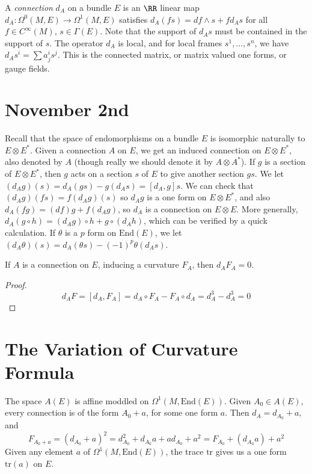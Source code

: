 A \emph{connection} $d_A$ on a bundle $E$ is an $\RR$ linear map $d_A: \Omega^0(M,E) \to \Omega^1(M,E)$ satisfies $d_A(fs) = df \wedge s + f d_A s$ for all $f \in C^\infty(M)$, $s \in \Gamma(E)$. Note that the support of $d_A s$ must be contained in the support of $s$. The operator $d_A$ is local, and for local frames $s^1, \dots, s^n$, we have $d_A s^i = \sum a_j^i s^j$. This is the connected matrix, or matrix valued one forms, or gauge fields.


\section{November 2nd}

Recall that the space of endomorphisms on a bundle $E$ is isomorphic naturally to $E \otimes E^*$. Given a connection $A$ on $E$, we get an induced connection on $E \otimes E^*$, also denoted by $A$ (though really we should denote it by $A \otimes A^*$). If $g$ is a section of $E \otimes E^*$, then $g$ acts on a section $s$ of $E$ to give another section $gs$. We let $(d_A g)(s) = d_A(gs) - g(d_A s) = [d_A, g] s$. We can check that $(d_A g)(fs) = f(d_A g)(s)$ so $d_A g$ is a one form on $E \otimes E^*$, and also $d_A(fg) = (df) g + f (d_A g)$, so $d_A$ is a connection on $E \otimes E$. More generally, $d_A(g \circ h) = (d_A g) \circ h + g \circ (d_A h)$, which can be verified by a quick calculation. If $\theta$ is a $p$ form on $\text{End}(E)$, we let $(d_A \theta)(s) = d_A(\theta s) - (-1)^p \theta(d_A s)$.

\begin{theorem}
    If $A$ is a connection on $E$, inducing a curvature $F_A$, then $d_A F_A = 0$.
\end{theorem}
\begin{proof}
    \[ d_A F = [d_A,F_A] = d_A \circ F_A - F_A \circ d_A = d_A^3 - d_A^3 = 0 \]
\end{proof}

\section{The Variation of Curvature Formula}

The space $A(E)$ is affine moddled on $\Omega^1(M, \text{End}(E))$. Given $A_0 \in A(E)$, every connection is of the form $A_0 + a$, for some one form $a$. Then $d_A = d_{A_0} + a$, and
%
\[ F_{A_0 + a} = (d_{A_0} + a)^2 = d_{A_0}^2 + d_{A_0} a + a d_{A_0} + a^2 = F_{A_0} + (d_{A_0} a) + a^2 \]
%
Given any element $a$ of $\Omega^1(M, \text{End}(E))$, the trace $\text{tr}$ gives us a one form $\text{tr}(a)$ on $E$.

